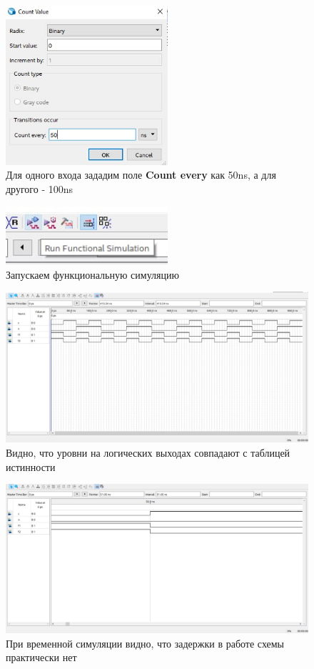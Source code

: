 \documentclass[a4paper,12pt]{article}
\begin{document}
  \begin{figure}[H]
    \centering
    \includegraphics[width=6cm]{01_15}
    \caption{Для одного входа зададим поле \textbf{Count every} как 50ns, а для другого - 100ns}
  \end{figure}

  \begin{figure}[H]
    \centering
    \includegraphics[width=6cm]{01_16}
    \caption{Запускаем функциональную симуляцию}
  \end{figure}

  \begin{figure}[H]
    \centering
    \includegraphics[width=12cm]{01_17}
    \caption{Видно, что уровни на логических выходах совпадают с таблицей истинности}
  \end{figure}

  \begin{figure}[H]
    \centering
    \includegraphics[width=12cm]{01_18}
    \caption{При временной симуляции видно, что задержки в работе схемы практически нет}
  \end{figure}
\end{document}
